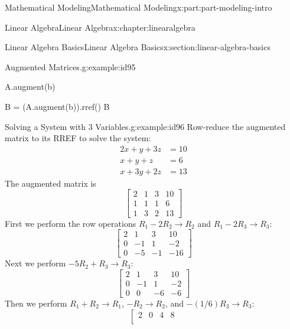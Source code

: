 \documentclass[oneside,10pt,]{book}
\numberwithin{equation}{section}
\begin{document}
\begin{partptx}{Mathematical Modeling}{}{Mathematical Modeling}{}{}{x:part:part-modeling-intro}
\begin{chapterptx}{Linear Algebra}{}{Linear Algebra}{}{}{x:chapter:linearalgebra}
\begin{sectionptx}{Linear Algebra Basics}{}{Linear Algebra Basics}{}{}{x:section:linear-algebra-basics}
\begin{example}{Augmented Matrices.}{g:example:id95}
\begin{sageinput}
A.augment(b)
\end{sageinput}
\begin{sageoutput}
[ 1  2  2]
[ 3 -4  6]
\end{sageoutput}
\begin{sageinput}
B = (A.augment(b)).rref()
B
\end{sageinput}
\begin{sageoutput}
[1 0 2]
[0 1 0]
\end{sageoutput}
\end{example}
\begin{example}{Solving a System with 3 Variables.}{g:example:id96}%
Row-reduce the augmented matrix to its RREF to solve the system:%
%
\begin{equation*}
\begin{aligned}
2x + y + 3z & = 10 \\
x + y + z & = 6 \\
x + 3y + 2z & = 13
\end{aligned}
\end{equation*}
The augmented matrix is%
%
\begin{equation*}
\left[\begin{array}{rrr|r}
2 & 1 & 3 & 10 \\
1 & 1 & 1 & 6 \\
1 & 3 & 2 & 13
\end{array}\right]
\end{equation*}
First we perform the row operations \(R_1-2R_2\to R_2\) and \(R_1-2R_3\to R_3\):%
%
\begin{equation*}
\left[\begin{array}{rrr|r}
2 & 1 & 3 & 10 \\
0 & -1 & 1 & -2 \\
0 & -5 & -1 & -16
\end{array}\right]
\end{equation*}
Next we perform \(-5R_2+R_3 \to R_3\):%
%
\begin{equation*}
\left[\begin{array}{rrr|r}
2 & 1 & 3 & 10 \\
0 & -1 & 1 & -2 \\
0 & 0 & -6 & -6
\end{array}\right]
\end{equation*}
Then we perform \(R_1+R_2\to R_1\), \(-R_2\to R_2\), and \(-(1/6)R_3\to R_3\):%
%
\begin{equation*}
\left[\begin{array}{rrr|r}
2 & 0 & 4 & 8 \\

\end{array}
\end{equation*}
\end{example}
\end{sectionptx}
\end{chapterptx}
\end{partptx}
\end{document}
